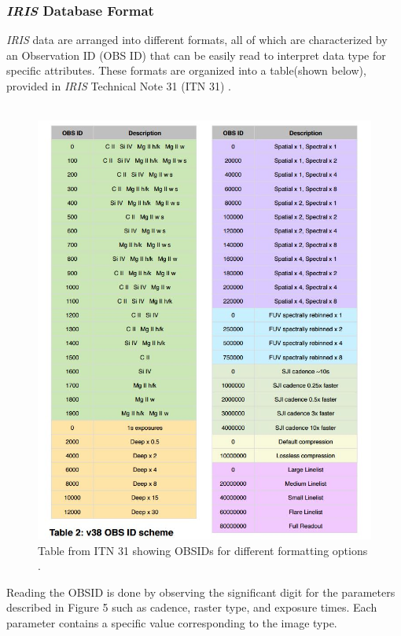 \documentclass[10pt,a4paper,titlepage]{article}
\begin{document}
			\subsubsection{\textit{IRIS} Database Format}
				\textit{IRIS} data are arranged into different formats, all of which are characterized by an Observation ID (OBS ID) that can be easily read to interpret data type for specific attributes. These formats are organized into a table(shown below), provided in \textit{IRIS} Technical Note 31 (ITN 31) \cite{ITN31}.\\\\
				\begin{figure}[H]
					\includegraphics[scale=0.62]{obsid}
					\centering
					\caption{Table from ITN 31 showing OBSIDs for different formatting options \cite{ITN31}.}
					\centering
				\end{figure}
			
						
				Reading the OBSID is done by observing the significant digit for the parameters described in Figure 5 such as cadence, raster type, and exposure times. Each parameter contains a specific value corresponding to the image type.
				
\end{document}
